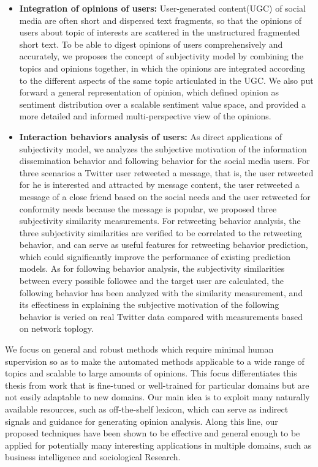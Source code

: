 \begin{eabstract}
\begin{itemize}
\item \textbf{Integration of opinions of users:} User-generated content(UGC) of social media are often short and dispersed text fragments, so that the opinions of users about topic of interests are scattered in the unstructured fragmented short text. To be able to digest opinions of users comprehensively and accurately, we proposes the concept of subjectivity model by combining the topics and opinions together, in which the opinions are integrated according to the different aspects of the same topic articulated in the UGC. We also put forward a general representation of opinion, which defined opinion as sentiment distribution over a scalable sentiment value space, and provided a more detailed and informed multi-perspective view of the opinions.
\item \textbf{Interaction behaviors analysis of users:} As direct applications of subjectivity model, we analyzes the subjective motivation of the information dissemination behavior and following behavior for the social media users. For three scenarios a Twitter user retweeted a message, that is, the user retweeted for he is interested and attracted by message content, the user retweeted a message of a close friend based on the social needs and the user retweeted for conformity needs because the message is popular, we proposed three subjectivity similarity measurements. For retweeting behavior analysis, the three subjectivity similarities are verified to be correlated to the retweeting behavior, and can serve as useful features for retweeting behavior prediction, which could significantly improve the performance of existing prediction models. As for following behavior analysis, the subjectivity similarities between every possible followee and the target user are calculated, the following behavior has been analyzed with the similarity measurement, and its effectiness in explaining the subjective motivation of the following behavior is veried on real Twitter data compared with measurements based on network toplogy.
\end{itemize}

We focus on general and robust methods which require minimal human supervision so as to make the automated methods applicable to a wide range of topics and scalable to large amounts of opinions. This focus differentiates this thesis from work that is fine-tuned or well-trained for particular domains but are not easily adaptable to new domains. Our main idea is to exploit many naturally available resources, such as off-the-shelf lexicon, which can serve as indirect signals and guidance for generating opinion analysis. Along this line, our proposed techniques have been shown to be effective and general enough to be applied for potentially many interesting applications in multiple domains, such as business intelligence and sociological Research.
\end{eabstract}


